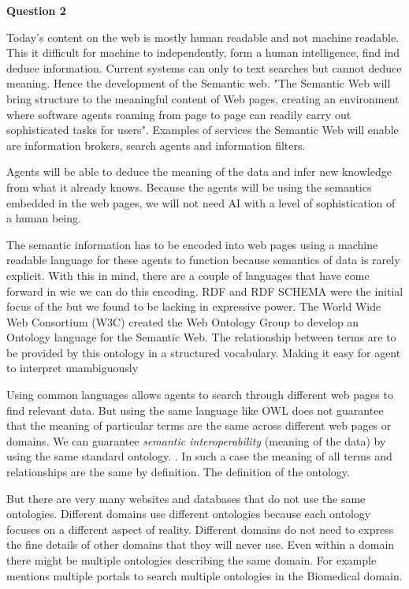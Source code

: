 \documentclass[12pt,a4paper]{article}
\begin{document}
\textbf{Question 2}
\newline

Today's content on the web is mostly human readable and not machine readable. This it difficult for machine to independently, form a human intelligence, find ind deduce information. Current systems can only to text searches but cannot deduce meaning. Hence the development of the Semantic web. "The Semantic Web will bring structure to the meaningful content of Web pages, creating an environment where software agents roaming from page to page can readily carry out sophisticated tasks for users". \citep{lee2001} Examples of services the Semantic Web will enable are information brokers, search agents and information filters. \citep{Decker} 

Agents will be able to deduce the meaning of the data and infer new knowledge from what it already knows. Because the agents will be using the semantics embedded in the web pages, we will not need AI with a level of sophistication of a human being. \citep{lee2001}

The semantic information has to be encoded into web pages using a machine readable language for these agents to function because semantics of data is rarely explicit. \citep{Heiler1995a}  With this in mind, there are a couple of languages that have come forward in wic we can do this encoding. RDF and RDF SCHEMA were the initial focus of the but we found to be lacking in expressive power. The World Wide Web Consortium (W3C) created the Web Ontology Group to develop an Ontology language for the Semantic Web. The relationship between terms are to be provided by this ontology in a structured vocabulary. Making it easy for agent to interpret unambiguously \citep{Horrocks2003}

Using common languages allows agents to search through different web pages to find relevant data. But using the same language like OWL does not guarantee that the meaning of particular terms are the same across different web pages or domains. We can guarantee \emph{semantic interoperability} (meaning of the data) by using the same standard ontology. \citep{VanDiggelen2007}. In such a case the meaning of all terms and relationships are the same by definition. The definition of the ontology.

But there are very many websites and databases that do not use the same ontologies. Different domains use different ontologies because each ontology focuses on a different aspect of reality.\citep{can} Different domains do not need to express the fine details of other domains that they will never use. Even within a domain there might be multiple ontologies describing the same domain. For example \cite{gros2014} mentions multiple portals to search multiple ontologies in the Biomedical domain.
\end{document}
